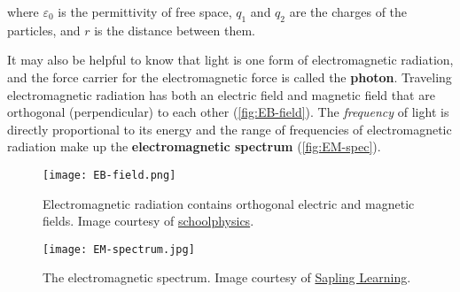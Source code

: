 \noindent where $\varepsilon_0$ is the permittivity of free space, $q_1$ and $q_2$ are the charges of the particles, and $r$ is the distance between them.

It may also be helpful to know that light is one form of electromagnetic radiation, and the force carrier for the electromagnetic force is called the \textbf{photon}. 
Traveling electromagnetic radiation has both an electric field and magnetic field that are orthogonal (perpendicular) to each other (\autoref{fig:EB-field}). 
The \emph{frequency} of light is directly proportional to its energy and the range of frequencies of electromagnetic radiation make up the \textbf{electromagnetic spectrum} (\autoref{fig:EM-spec}).

\begin{figure}[!h]
	\centering
	\texttt{[image: EB-field.png]}
	\caption{Electromagnetic radiation contains orthogonal electric and magnetic fields. Image courtesy of \href{http://www.schoolphysics.co.uk/age16-19/Wave\%20properties/Polarisation/text/Polarisation_/images/2.png}{schoolphysics}.}
	\label{fig:EB-field}
\end{figure}

\begin{figure}[!h]
	\centering
	\texttt{[image: EM-spectrum.jpg]}
	\caption{The electromagnetic spectrum. Image courtesy of \href{https://sites.google.com/site/chempendix/em-spectrum}{Sapling Learning}.}
	\label{fig:EM-spec}
\end{figure}

%